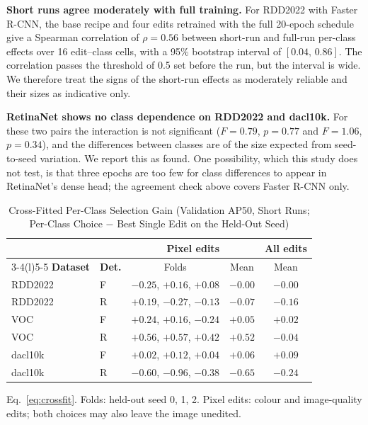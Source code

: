 \documentclass[conference]{IEEEtran}
\begin{document}
\noindent\textbf{Short runs agree moderately with full training.} For RDD2022 with Faster R-CNN, the base recipe and four edits retrained with the full 20-epoch schedule give a Spearman correlation of $\rho=0.56$ between short-run and full-run per-class effects over 16 edit--class cells, with a 95\% bootstrap interval of $[0.04,\,0.86]$. The correlation passes the threshold of 0.5 set before the run, but the interval is wide. We therefore treat the signs of the short-run effects as moderately reliable and their sizes as indicative only.

\noindent\textbf{RetinaNet shows no class dependence on RDD2022 and dacl10k.} For these two pairs the interaction is not significant ($F=0.79$, $p=0.77$ and $F=1.06$, $p=0.34$), and the differences between classes are of the size expected from seed-to-seed variation. We report this as found. One possibility, which this study does not test, is that three epochs are too few for class differences to appear in RetinaNet's dense head; the agreement check above covers Faster R-CNN only.

\begin{table}[t]
\caption{Cross-Fitted Per-Class Selection Gain (Validation AP50, Short Runs; Per-Class Choice $-$ Best Single Edit on the Held-Out Seed)}
\label{tab:crossfit}
\centering
\footnotesize
\setlength{\tabcolsep}{3pt}
\begin{tabular}{@{}llccc@{}}
\toprule
 & & \multicolumn{2}{c}{\textbf{Pixel edits}} & \textbf{All edits} \\
\cmidrule(lr){3-4}\cmidrule(l){5-5}
\textbf{Dataset} & \textbf{Det.} & Folds & Mean & Mean \\
\midrule
RDD2022 & F & $-0.25$, $+0.16$, $+0.08$ & $-0.00$ & $-0.00$ \\
RDD2022 & R & $+0.19$, $-0.27$, $-0.13$ & $-0.07$ & $-0.16$ \\
VOC & F & $+0.24$, $+0.16$, $-0.24$ & $+0.05$ & $+0.02$ \\
VOC & R & $+0.56$, $+0.57$, $+0.42$ & $+0.52$ & $-0.04$ \\
dacl10k & F & $+0.02$, $+0.12$, $+0.04$ & $+0.06$ & $+0.09$ \\
dacl10k & R & $-0.60$, $-0.96$, $-0.38$ & $-0.65$ & $-0.24$ \\
\bottomrule
\end{tabular}
\vspace{2pt}

\parbox{\columnwidth}{\footnotesize Eq.~\eqref{eq:crossfit}. Folds: held-out seed 0, 1, 2. Pixel edits: colour and image-quality edits; both choices may also leave the image unedited.}
\end{table}
\end{document}
